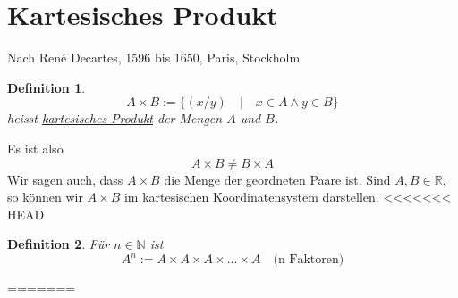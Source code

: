 \documentclass{report}
\newtheorem{mydef}{Definition}
\begin{document}
\section{Kartesisches Produkt}
Nach René Decartes, 1596 bis 1650, Paris, Stockholm
\begin{mydef}\begin{equation}A \times B := \{(x/y) \quad | \quad x \in A \land y \in B\}\end{equation}heisst \underline{kartesisches Produkt} der Mengen $A$ und $B$.\end{mydef}
Es ist also
\begin{equation}A \times B \neq B \times A\end{equation}
Wir sagen auch, dass $A \times B$ die Menge der geordneten Paare ist. Sind $A, B \in \mathbb{R}$, so können wir $A \times B$ im \underline{kartesischen Koordinatensystem} darstellen.
<<<<<<< HEAD
\begin{mydef}Für $n \in \mathbb{N}$ ist
\begin{equation}A^n := A \times A \times A \times ... \times A \quad \mbox{(n Faktoren)}\end{equation}\end{mydef}
=======
\end{document}
